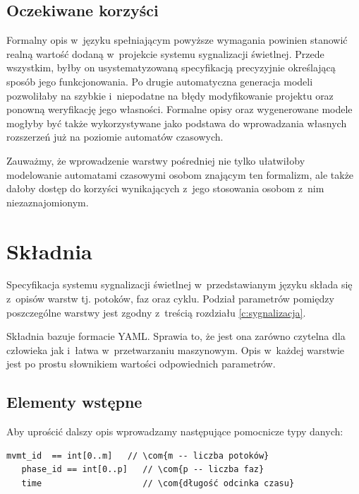 \documentclass{pracamgr}
\theoremstyle{plain}
\newcommand{\com}[1]{\upshape\color{light-gray}{#1}}
\begin{document}
\subsection{Oczekiwane korzyści}
\label{ss:lang:req:benefits}
Formalny opis w~języku spełniającym powyższe wymagania powinien
stanowić realną wartość dodaną w~projekcie systemu sygnalizacji
świetlnej. Przede wszystkim, byłby on usystematyzowaną
specyfikacją precyzyjnie określającą sposób jego funkcjonowania. Po
drugie automatyczna generacja modeli pozwoliłaby na szybkie
i~niepodatne na błędy modyfikowanie projektu oraz ponowną weryfikację jego
własności. Formalne opisy oraz wygenerowane modele mogłyby być także
wykorzystywane jako podstawa do wprowadzania własnych rozszerzeń już
na poziomie automatów czasowych.

Zauważmy, że wprowadzenie warstwy pośredniej nie tylko ułatwiłoby
modelowanie automatami czasowymi osobom znającym ten formalizm, ale
także dałoby dostęp do korzyści wynikających z~jego stosowania osobom
z~nim niezaznajomionym.


\section{Składnia}
\label{c:lang:lang}
Specyfikacja systemu sygnalizacji świetlnej w~przedstawianym języku
składa się z~opisów warstw tj. potoków, faz oraz cyklu.
Podział parametrów pomiędzy poszczególne warstwy jest zgodny
z~treścią rozdziału \ref{c:sygnalizacja}.

Składnia bazuje formacie YAML\cite{YAML}. Sprawia to, że jest ona
zarówno czytelna dla człowieka jak i~łatwa w~przetwarzaniu
maszynowym. Opis w~każdej warstwie jest po prostu słownikiem wartości
odpowiednich parametrów.


\subsection{Elementy wstępne}
Aby uprościć dalszy opis wprowadzamy następujące pomocnicze typy danych:
\begin{lstlisting}[caption=Pomocniczne typy danych.]
   mvmt_id  == int[0..m]   // \com{m -- liczba potoków}
   phase_id == int[0..p]   // \com{p -- liczba faz}
   time                    // \com{długość odcinka czasu}
\end{lstlisting}
\end{document}
